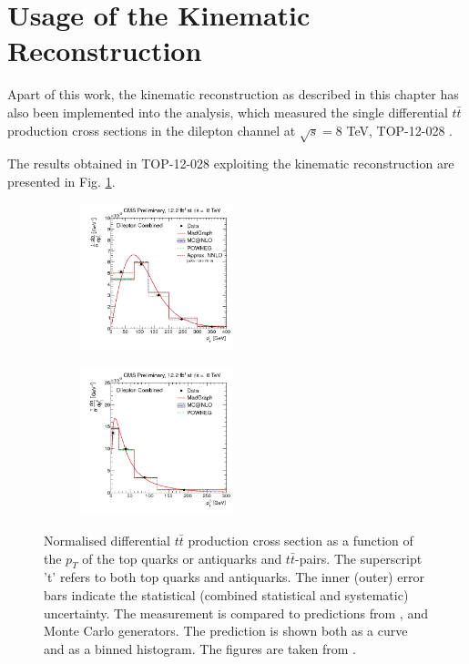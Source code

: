 \section{Usage of the Kinematic Reconstruction}

Apart of this work, the kinematic reconstruction as described in this chapter has also been implemented into the analysis, which measured the single differential $t\bar{t}$
production cross sections in the dilepton channel at $\sqrt{s} = $8 TeV, TOP-12-028 \cite{Khachatryan:2015oqa} \cite{TWikiTOP12028}. 

The results obtained in TOP-12-028 \cite{Khachatryan:2015oqa} \cite{TWikiTOP12028} exploiting the kinematic reconstruction are presented 
in Fig. \ref{fig:xsec_top12028}.

\begin{figure}[h]
\centering
\begin{subfigure}
  \centering
  \includegraphics[width=0.49\textwidth]{05_kinReco/plots/DiffXS_HypToppT.png}
\end{subfigure}
\begin{subfigure}
  \centering
  \includegraphics[width=0.49\textwidth]{05_kinReco/plots/DiffXS_HypTTBarpT.png}
\end{subfigure}
\caption{Normalised differential $t\bar{t}$ production cross section as a function of the $p_{T}$ of the top quarks or antiquarks and $t\bar{t}$-pairs. 
         The superscript 't' refers to both top quarks and antiquarks. The inner (outer) error bars indicate the statistical (combined statistical and 
         systematic) uncertainty. The measurement is compared to predictions from \MG, \Powheg and \MCNLO Monte Carlo generators. The \MG prediction is 
         shown both as a curve and as a binned histogram. The figures are taken from \cite{TWikiTOP12028} \cite{Khachatryan:2015oqa}.}
\label{fig:xsec_top12028}
\end{figure}